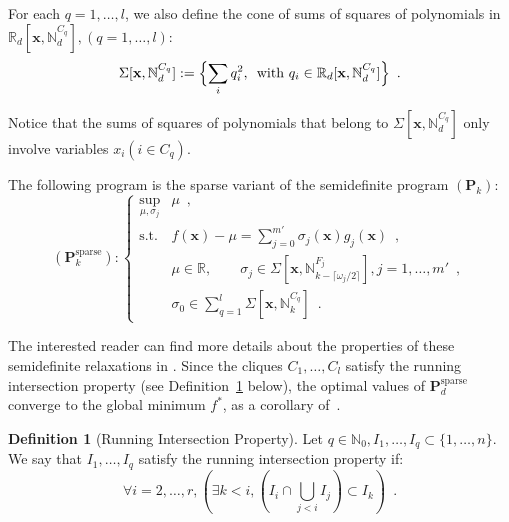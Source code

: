 \documentclass[a4paper,10pt]{article}
\newcommand{\mons}[2]{\N_{#1}^{#2}}
\newcommand{\R}{\mathbb{R}}
\newcommand{\N}{\mathbb{N}}
\newcommand{\x}{\mathbf{x}}
\def\P{\mathbf{P}}
\theoremstyle{plain}
\theoremstyle{definition}
\newtheorem{definition}[theorem]{Definition}
\theoremstyle{remark}
\begin{document}
For each $q=1 ,\dots,l$, we also define the cone of sums of squares of polynomials in $\R_d[\x, \mons{d}{C_q}], (q=1 ,\dots,l)$:
\begin{equation}
\label{eq:cone_sos_sparse}
\Sigma [\x, \mons{d}{C_q}] := \Bigl\{\sum_i q_i^2, \, \text{ with } q_i \in \R_d[\x, \mons{d}{C_q}] \Bigr\}\enspace.
\end{equation}

Notice that the sums of squares of polynomials that belong to $\Sigma [\x, \mons{d}{C_q}]$ only involve variables $x_i (i \in C_q)$. 

The following program is the sparse variant of the semidefinite program $(\P_k)$:
\[
(\P^{\text{sparse}}_k):\left\{			
\begin{array}{ll}
\sup_{\mu, \sigma_j} & \mu\enspace, \\			 
\text{s.t.} & f (\x) - \mu = \sum\limits_{j = 0}^{m'} \sigma_j(\x) g_j(\x)\enspace, \\
& \mu\in \R,\qquad \sigma_j \in \Sigma[\x, \mons{k - \lceil \omega_j / 2 \rceil }{F_j}], j = 1,\dots,m' \enspace,\\
& \sigma_0 \in \sum\limits_{q = 1}^l \Sigma [\x, \mons{k}{C_q}]\enspace.
\end{array} \right.
\]

The interested reader can find more details about the properties of these semidefinite relaxations in \cite{Waki06SparseSOS}. Since the cliques $C_1, \dots, C_l$ satisfy the running intersection property (see Definition~\ref{def:rip} below), the optimal values of $\P_d^{\text{sparse}}$ converge to the global minimum $f^*$, as a corollary of~\cite[Theorem 3.6]{Las06SparseSOS}.

\begin{definition}[Running Intersection Property]
\label{def:rip}
Let $q \in \N_0, I_1, \dots, I_q \subset \{1, \dots, n\}$. We say that $I_1, \dots, I_q$ satisfy the running intersection property if: 
\[ \forall i = 2, \dots, r, (\exists k < i, (I_i \cap \bigcup\limits_{j < i} I_j) \subset I_k)\enspace. \]
\end{definition}
\end{document}
